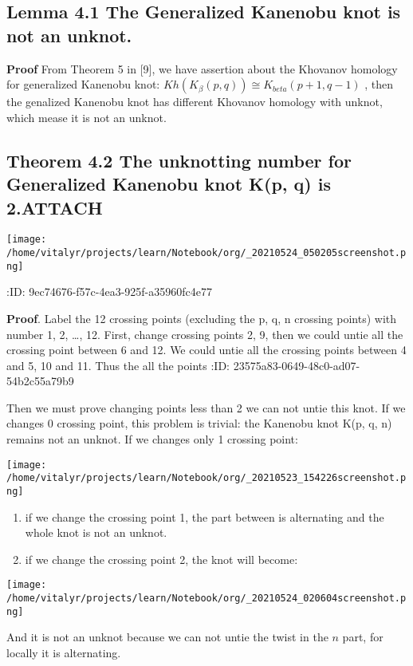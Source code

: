 \documentclass[a4paper]{article}
\begin{document}
\subsection{Lemma 4.1 The Generalized Kanenobu knot is not an unknot.}
\label{sec:orgd40950c}
\textbf{Proof} From Theorem 5 in [9], we have assertion about the Khovanov homology for generalized Kanenobu knot:
\(Kh(K_{\beta}(p,q)) \cong K_{beta}(p+1, q-1)\) ,
then the genalized Kanenobu knot has different Khovanov homology with unknot, which mease it is not an unknot.
\subsection{Theorem 4.2 The unknotting number for Generalized Kanenobu knot K(p, q) is 2.\hfill{}\textsc{ATTACH}}
\label{sec:org953d8e2}
\begin{center}
\texttt{[image: /home/vitalyr/projects/learn/Notebook/org/\_20210524\_050205screenshot.png]}
\end{center}
:ID:       9ec74676-f57c-4ea3-925f-a35960fc4e77

\textbf{Proof}.
Label the 12 crossing points (excluding the p, q, n crossing points) with number 1, 2, \ldots{}, 12.
First, change crossing points 2, 9, then  we could untie all the crossing point between 6 and 12.
We could untie all the crossing points between 4 and 5, 10 and 11. Thus the all the points
:ID:       23575a83-0649-48c0-ad07-54b2c55a79b9

Then we must prove changing points less than 2 we can not untie this knot.
If we changes 0 crossing point, this problem is trivial: the Kanenobu knot K(p, q, n) remains not an unknot.
If we changes only 1 crossing point:

\begin{center}
\texttt{[image: /home/vitalyr/projects/learn/Notebook/org/\_20210523\_154226screenshot.png]}
\end{center}
\begin{enumerate}
\item if we change the crossing point 1, the part between is alternating and the whole knot is not an unknot.
\item if we change the crossing point 2, the knot will become:
\end{enumerate}
\begin{center}
\texttt{[image: /home/vitalyr/projects/learn/Notebook/org/\_20210524\_020604screenshot.png]}
\end{center}
And it is not an unknot because we can not untie the twist in the \(n\) part, for locally it is alternating.
\end{document}
